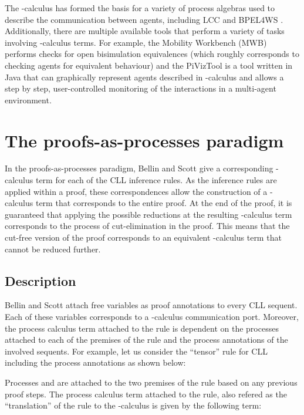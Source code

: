\documentclass[copyright,creativecommons]{eptcs}
\begin{document}
The -calculus has formed the basis for a variety of process algebras used to describe the communication between agents, including LCC \cite{robertson2004lightweight} and BPEL4WS \cite{andrews2003business}. Additionally, there are multiple available tools that perform a variety of tasks involving -calculus terms. For example, the Mobility Workbench (MWB) \cite{victor1994mobility} performs checks for open bisimulation equivalences \cite{sangiorgi1996theory} (which roughly corresponds to checking agents for equivalent behaviour) and the PiVizTool \cite{bog2006tool} is a tool written in Java that can graphically represent agents described in -calculus and allows a step by step, user-controlled monitoring of the interactions in a multi-agent environment. 


\section{The proofs-as-processes paradigm}
\label{paradigm}

In the proofs-as-processes paradigm, Bellin and Scott \cite{bellin1994} give a corresponding -calculus term for each of the CLL inference rules. As the inference rules are applied within a proof, these correspondences allow the construction of a -calculus term that corresponds to the entire proof. At the end of the proof, it is guaranteed that applying the possible reductions at the resulting -calculus term corresponds to the process of cut-elimination in the proof. This means that the cut-free version of the proof corresponds to an equivalent -calculus term that cannot be reduced further.

\subsection{Description}
\label{papdesc}

Bellin and Scott attach free variables as proof annotations to every CLL sequent. Each of these variables corresponds to a -calculus communication port. Moreover, the process calculus term attached to the rule is dependent on the processes attached to each of the premises of the rule and the process annotations of the involved sequents. For example, let us consider the ``tensor'' rule for CLL including the process annotations as shown below:


Processes  and  are attached to the two premises of the rule based on any previous proof steps. The process calculus term attached to the rule, also refered as the ``translation'' of the rule to the -calculus is given by the following term:
\end{document}
